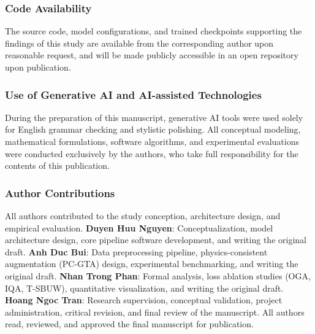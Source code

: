 \subsubsection*{Code Availability}
The source code, model configurations, and trained checkpoints supporting the findings of this study are available from the corresponding author upon reasonable request, and will be made publicly accessible in an open repository upon publication.

\subsubsection*{Use of Generative AI and AI-assisted Technologies}
During the preparation of this manuscript, generative AI tools were used solely for English grammar checking and stylistic polishing. All conceptual modeling, mathematical formulations, software algorithms, and experimental evaluations were conducted exclusively by the authors, who take full responsibility for the contents of this publication.

\subsubsection*{Author Contributions}
All authors contributed to the study conception, architecture design, and empirical evaluation.
\textbf{Duyen Huu Nguyen}: Conceptualization, model architecture design, core pipeline software development, and writing the original draft. 
\textbf{Anh Duc Bui}: Data preprocessing pipeline, physics-consistent augmentation (PC-GTA) design, experimental benchmarking, and writing the original draft. 
\textbf{Nhan Trong Phan}: Formal analysis, loss ablation studies (OGA, IQA, T-SBUW), quantitative visualization, and writing the original draft. 
\textbf{Hoang Ngoc Tran}: Research supervision, conceptual validation, project administration, critical revision, and final review of the manuscript. 
All authors read, reviewed, and approved the final manuscript for publication.
